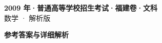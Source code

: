 \documentclass[zihao=-4, a4paper]{ctexart}
\begin{document}
\begin{center}
  {\Large\bfseries 2009 年·普通高等学校招生考试·福建卷·文科}\\[4pt]
  {\large 数学 · 解析版}
\end{center}
\medskip
{}

\clearpage
{}
\begin{center}{\Large\bfseries 参考答案与详细解析}\end{center}
\medskip

\end{document}
